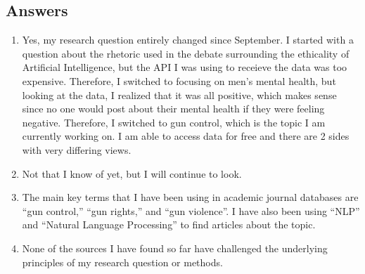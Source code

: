\subsection{Answers}
\begin{enumerate}
  \item Yes, my research question entirely changed since September. I started with a question about the rhetoric used in the debate surrounding the ethicality of Artificial Intelligence, but the API I was using to receieve the data was too expensive. Therefore, I switched to focusing on men's mental health, but looking at the data, I realized that it was all positive, which makes sense since no one would post about their mental health if they were feeling negative. Therefore, I switched to gun control, which is the topic I am currently working on. I am able to access data for free and there are 2 sides with very differing views.
  \item Not that I know of yet, but I will continue to look.
  \item The main key terms that I have been using in academic journal databases are ``gun control,'' ``gun rights,'' and ``gun violence''. I have also been using ``NLP'' and ``Natural Language Processing'' to find articles about the topic.
  \item None of the sources I have found so far have challenged the underlying principles of my research question or methods.
\end{enumerate}